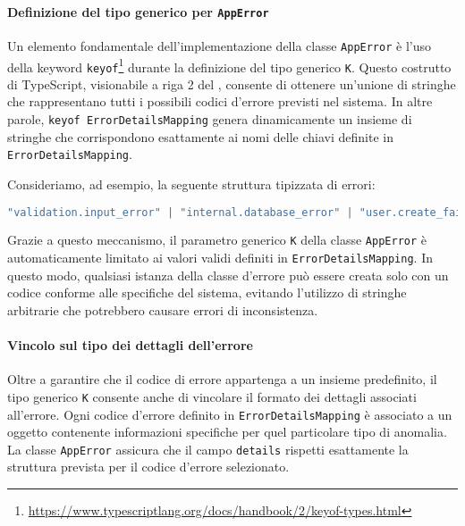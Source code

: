 

\paragraph{Definizione del tipo generico per \texttt{AppError}}
Un elemento fondamentale dell'implementazione della classe \texttt{AppError} è l'uso della keyword \texttt{keyof}\footnote{\url{https://www.typescriptlang.org/docs/handbook/2/keyof-types.html}} durante la definizione del tipo generico \texttt{K}. Questo costrutto di TypeScript, visionabile a riga 2 del , consente di ottenere un'unione di stringhe che rappresentano tutti i possibili codici d'errore previsti nel sistema. In altre parole, \texttt{keyof ErrorDetailsMapping} genera dinamicamente un insieme di stringhe che corrispondono esattamente ai nomi delle chiavi definite in \texttt{ErrorDetailsMapping}.

Consideriamo, ad esempio, la seguente struttura tipizzata di errori:
\begin{lstlisting}[language=typescript, caption={Esempio di unione di stringhe generate da \texttt{keyof}}, label={lst:keyofExample}]
  "validation.input_error" | "internal.database_error" | "user.create_failed"
\end{lstlisting}

Grazie a questo meccanismo, il parametro generico \texttt{K} della classe \texttt{AppError} è automaticamente limitato ai valori validi definiti in \texttt{ErrorDetailsMapping}. In questo modo, qualsiasi istanza della classe d'errore può essere creata solo con un codice conforme alle specifiche del sistema, evitando l'utilizzo di stringhe arbitrarie che potrebbero causare errori di inconsistenza.

\paragraph{Vincolo sul tipo dei dettagli dell’errore}
Oltre a garantire che il codice di errore appartenga a un insieme predefinito, il tipo generico \texttt{K} consente anche di vincolare il formato dei dettagli associati all’errore. Ogni codice d’errore definito in \texttt{ErrorDetailsMapping} è associato a un oggetto contenente informazioni specifiche per quel particolare tipo di anomalia. La classe \texttt{AppError} assicura che il campo \texttt{details} rispetti esattamente la struttura prevista per il codice d’errore selezionato.

